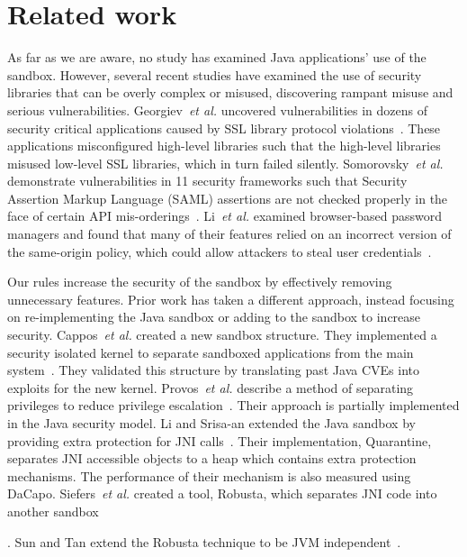\documentclass{sig-alternate}
\begin{document}
\section{Related work}
\label{sec:related}

As far
as we are aware, no study has examined Java applications' use of the
sandbox. However, several recent studies have examined the use of security
libraries that can be overly complex or 
misused, discovering rampant misuse and
serious vulnerabilities.
Georgiev~\emph{et al.} uncovered vulnerabilities in dozens of security critical
applications caused by SSL library protocol violations~\cite{georgiev12most-dangerous}.
These applications misconfigured high-level libraries such that the
high-level libraries misused low-level SSL libraries, which in turn
failed silently. Somorovsky~\emph{et al.} demonstrate vulnerabilities in
11 security frameworks such that Security Assertion Markup Language
(SAML) assertions are not checked properly in the face of certain API
mis-orderings~\cite{somorovsky12breaking}. Li~\emph{et al.} examined
browser-based  
password managers and found that many of their features relied on
an incorrect version of the same-origin policy, which could allow
attackers to steal user credentials~\cite{li2014emperor}.

Our rules increase the security of the sandbox
by effectively removing unnecessary features. Prior work has taken a different
approach, instead focusing on re-implementing the Java sandbox or
adding to the sandbox to increase security. Cappos~\emph{et al.} created
a new sandbox structure. They implemented a security isolated kernel
to separate sandboxed applications from the main system~\cite{cappos_retaining_2010}.
They validated this structure by translating past Java CVEs into exploits
for the new kernel. Provos~\emph{et al.} describe a method of separating
privileges to reduce privilege escalation~\cite{Provos-PrivilegeEscalation}.
Their approach is partially implemented in the Java security model.
Li and Srisa-an extended the Java sandbox by providing extra protection
for JNI calls~\cite{li_quarantine:_2011}. Their implementation, Quarantine,
separates JNI accessible objects to a heap which contains extra protection
mechanisms. The performance of their mechanism is also measured using
DaCapo. Siefers~\emph{et al.} created a tool, Robusta, which separates JNI
code into another sandbox~\cite{siefers_robusta:_2010}%

. Sun and Tan extend the Robusta technique to be JVM independent~\cite{sun_jvm-portable_2012}. 
\end{document}
